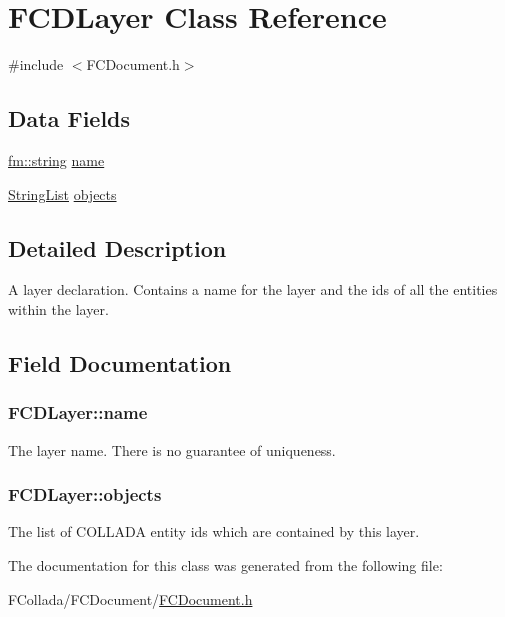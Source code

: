\hypertarget{classFCDLayer}{
\section{FCDLayer Class Reference}
\label{classFCDLayer}
}


{\ttfamily \#include $<$FCDocument.h$>$}

\subsection*{Data Fields}
\begin{DoxyCompactItemize}
\item 
\hyperlink{classfm_1_1stringT}{fm::string} \hyperlink{classFCDLayer_a4822be9dda053acf9e716a221ce2238e}{name}
\item 
\hyperlink{classfm_1_1vector}{StringList} \hyperlink{classFCDLayer_a63c94e949b25992748a0f334b8eb2a45}{objects}
\end{DoxyCompactItemize}


\subsection{Detailed Description}
A layer declaration. Contains a name for the layer and the ids of all the entities within the layer. 

\subsection{Field Documentation}
\hypertarget{classFCDLayer_a4822be9dda053acf9e716a221ce2238e}{
\subsubsection[{name}]{ {\bf FCDLayer::name}}}
\label{classFCDLayer_a4822be9dda053acf9e716a221ce2238e}
The layer name. There is no guarantee of uniqueness. \hypertarget{classFCDLayer_a63c94e949b25992748a0f334b8eb2a45}{
\subsubsection[{objects}]{ {\bf FCDLayer::objects}}}
\label{classFCDLayer_a63c94e949b25992748a0f334b8eb2a45}
The list of COLLADA entity ids which are contained by this layer. 

The documentation for this class was generated from the following file:\begin{DoxyCompactItemize}
\item 
FCollada/FCDocument/\hyperlink{FCDocument_8h}{FCDocument.h}\end{DoxyCompactItemize}
